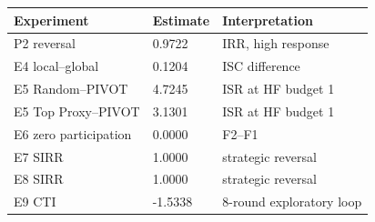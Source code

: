 \begin{tabular}{lll}
\toprule
Experiment & Estimate & Interpretation \\
\midrule
P2 reversal & 0.9722 & IRR, high response \\
E4 local--global & 0.1204 & ISC difference \\
E5 Random--PIVOT & 4.7245 & ISR at HF budget 1 \\
E5 Top Proxy--PIVOT & 3.1301 & ISR at HF budget 1 \\
E6 zero participation & 0.0000 & F2--F1 \\
E7 SIRR & 1.0000 & strategic reversal \\
E8 SIRR & 1.0000 & strategic reversal \\
E9 CTI & -1.5338 & 8-round exploratory loop \\
\bottomrule
\end{tabular}
